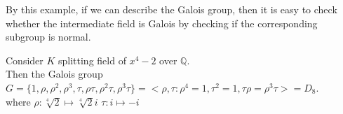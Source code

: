 By this example, if we can describe the Galois group, then it is easy to check whether the intermediate field is Galois by checking if the corresponding subgroup is normal.
\begin{example}
    Consider  $ K  $ splitting field of  $ x^4-2 $ over  $ \mathbb{Q} $.\\
    Then the Galois group  $ G=\{1,\rho,\rho^2,\rho^3,\tau,\rho\tau,\rho^2\tau,\rho^3\tau\}=<\rho,\tau:\rho^4=1 ,\tau^2=1,\tau\rho=\rho^3\tau>=D_8 $.\\
    where  $ \rho:\sqrt[4]{2}\mapsto \sqrt[4]{2}i $  $ \tau:i\mapsto -i $     
\end{example}